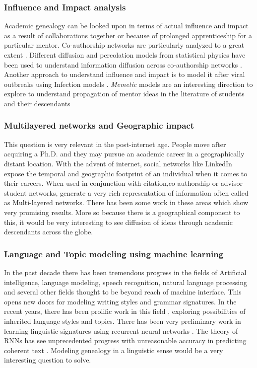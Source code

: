 \documentclass[a4paper]{article}
\begin{document}
\subsubsection{Influence and Impact analysis}
Academic genealogy can be looked upon in terms of actual influence and impact as a result of collaborations together or because of prolonged apprenticeship for a particular mentor. Co-authorship networks are particularly analyzed to a great extent \cite{glanzel2004analysing,kretschmer2004author,liu2005co,1742-5468-2005-09-P09008,chang2009exploring,solomon2000social}. Different diffusion and percolation models from statistical physics have been used to understand information diffusion across co-authorship networks \cite{solomon2000social,achlioptas2009explosive,watts2002simple,arnold2009information,cui2010citation}. Another approach to understand influence and impact is to model it after viral outbreaks using Infection models \cite{myers2012information}. \textit{Memetic} models are an interesting direction to explore to understand propagation of mentor ideas in the literature of students and their descendants \cite{kuhn2014inheritance} 

\subsubsection{Multilayered networks and Geographic impact}
This question is very relevant in the post-internet age. People move after acquiring a Ph.D. and they may pursue an academic career in a geographically distant location. With the advent of internet, social networks like LinkedIn expose the temporal and geographic footprint of an individual when it comes to their careers. When used in conjunction with citation,co-authorship or advisor-student networks, generate a very rich representation of information often called as Multi-layered networks. There has been some work in these areas \cite{cui2010citation,kazienko2010multi,li2009multi} which show very promising results. More so because there is a geographical component to this, it would be very interesting to see diffusion of ideas through academic descendants across the globe.

\subsubsection{Language and Topic modeling using machine learning}
In the past decade there has been tremendous progress in the fields of Artificial intelligence, language modeling, speech recognition, natural language processing and several other fields thought to be beyond reach of machine interface. This opens new doors for modeling writing styles and grammar signatures. In the recent years, there has been prolific work in this field \cite{rehurek2010software,wei2006lda}, exploring possibilities of inherited language styles and topics. There has been very preliminary work in learning linguistic signatures using recurrent neural networks \cite{bagnall2015author}. The theory of RNNs has see unprecedented progress with unreasonable accuracy in predicting coherent text \cite{sutskever2011generating}. Modeling genealogy in a linguistic sense would be a very interesting question to solve. 
\end{document}
